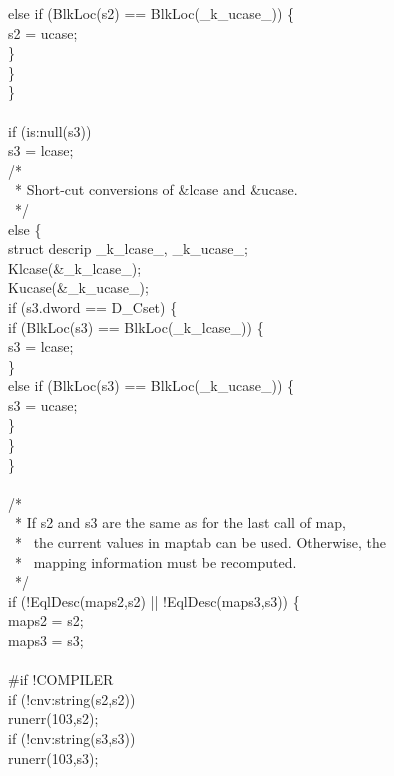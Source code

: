 \begin{iconcode}
\>\>\>else if (BlkLoc(s2) == BlkLoc(\_k\_ucase\_)) \{\\
\>\>\>\>s2 = ucase;\\
\>\>\>\}\\
\>\>\}\\
\>\}\\
\\
\>\>if (is:null(s3))\\
\>\>\>s3 = lcase;\\
\>\>/*\\
\>\>\ * Short-cut conversions of \&lcase and \&ucase.\\
\>\>\ */\\
\>\>else \{\\
\>\>\>struct descrip \_k\_lcase\_, \_k\_ucase\_;\\
\>\>\>Klcase(\&\_k\_lcase\_);\\
\>\>\>Kucase(\&\_k\_ucase\_);\\
\>\>\>if (s3.dword == D\_Cset) \{\\
\>\>\>\>if (BlkLoc(s3) == BlkLoc(\_k\_lcase\_)) \{\\
\>\>\>\>\>s3 = lcase;\\
\>\>\>\>\>\}\\
\>\>\>\>else if (BlkLoc(s3) == BlkLoc(\_k\_ucase\_)) \{\\
\>\>\>\>\>s3 = ucase;\\
\>\>\>\>\>\}\\
\>\>\>\>\}\\
\>\>\>\}\\
\\
\>\>/*\\
\>\>\ * If s2 and s3 are the same as for the last call of map,\\
\>\>\ * \ the current values in maptab can be used. Otherwise, the\\
\>\>\ * \ mapping information must be recomputed.\\
\>\>\ */\\
\>\>if (!EqlDesc(maps2,s2) || !EqlDesc(maps3,s3)) \{\\
\>\>\>maps2 = s2;\\
\>\>\>maps3 = s3;\\
\\
\#if !COMPILER\\
\>\>\>if (!cnv:string(s2,s2))\\
\>\>\>\>runerr(103,s2);\\
\>\>\>if (!cnv:string(s3,s3))\\
\>\>\>\>runerr(103,s3);\\

\end{iconcode}
